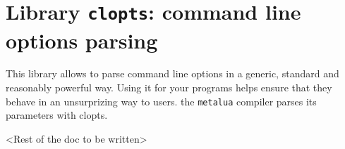 \section{Library {\tt clopts}: command line options parsing}
This library allows to parse command line options in a generic, standard and
reasonably powerful way. Using it for your programs helps ensure that they
behave in an unsurprizing way to users. the {\tt metalua} compiler parses its
parameters with clopts.

<Rest of the doc to be written>

